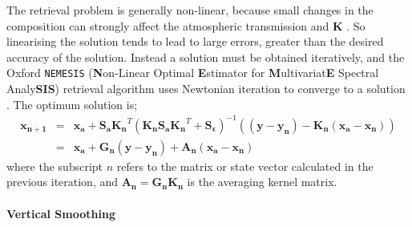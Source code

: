 \documentclass[final,5p,times,twocolumn,authoryear]{elsarticle}
\begin{document}
The retrieval problem is generally non-linear, because small changes in the composition can strongly affect the atmospheric transmission and $\mathbf{K}$ \citep{03irwbook}.  So linearising the solution tends to lead to large errors, greater than the desired accuracy of the solution.  Instead a solution must be obtained iteratively, and the Oxford \verb#NEMESIS# (\textbf{N}on-Linear Optimal \textbf{E}stimator for \textbf{M}ultivariat\textbf{E} Spectral Analy\textbf{SIS}) retrieval algorithm uses Newtonian iteration to converge to a solution \citep{04irwin}.  The optimum solution is;
\begin{eqnarray}
\mathbf{x_{n+1}} &=& \mathbf{x_a} + \mathbf{S_a}\mathbf{K_n}^{T} \left(\mathbf{K_n}\mathbf{S_a}\mathbf{K_n}^{T} + \mathbf{S_\epsilon} \right)^{-1} \mathbf{\left((y-y_n)-{K_n}(x_a-x_n)\right)} \\
&=& \mathbf{x_a} + \mathbf{G_n(y-y_n)} + \mathbf{A_n(x_a-x_n)}
\label{eq:optimal_solution}
\end{eqnarray}
where the subscript $n$ refers to the matrix or state vector calculated in the previous iteration, and $\mathbf{A_n=G_nK_n}$ is the averaging kernel matrix.

\paragraph{Vertical Smoothing}
\end{document}
